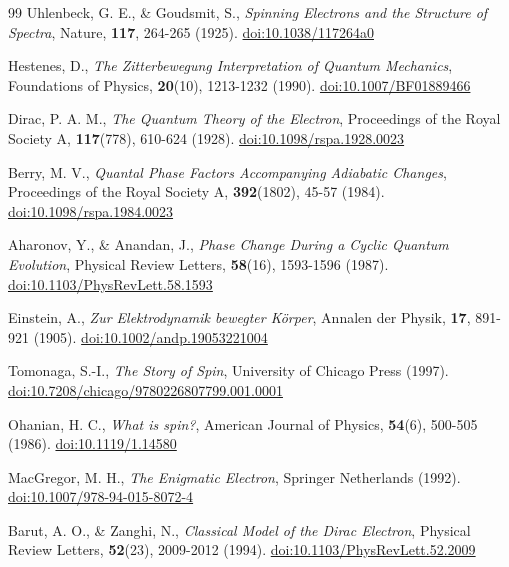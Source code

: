 \documentclass[%
 reprint,
 amsmath,amssymb,
 aps,
]{revtex4-1}
\numberwithin{equation}{section}%
\begin{document}
\begin{thebibliography}{99}
Uhlenbeck, G. E., \& Goudsmit, S.,
\textit{Spinning Electrons and the Structure of Spectra},
Nature,
\textbf{117}, 264-265 (1925).
\href{https://doi.org/10.1038/117264a0}{doi:10.1038/117264a0}

Hestenes, D.,
\textit{The Zitterbewegung Interpretation of Quantum Mechanics},
Foundations of Physics,
\textbf{20}(10), 1213-1232 (1990).
\href{https://doi.org/10.1007/BF01889466}{doi:10.1007/BF01889466}

Dirac, P. A. M.,
\textit{The Quantum Theory of the Electron},
Proceedings of the Royal Society A,
\textbf{117}(778), 610-624 (1928).
\href{https://doi.org/10.1098/rspa.1928.0023}{doi:10.1098/rspa.1928.0023}

Berry, M. V.,
\textit{Quantal Phase Factors Accompanying Adiabatic Changes},
Proceedings of the Royal Society A,
\textbf{392}(1802), 45-57 (1984).
\href{https://doi.org/10.1098/rspa.1984.0023}{doi:10.1098/rspa.1984.0023}

Aharonov, Y., \& Anandan, J.,
\textit{Phase Change During a Cyclic Quantum Evolution},
Physical Review Letters,
\textbf{58}(16), 1593-1596 (1987).
\href{https://doi.org/10.1103/PhysRevLett.58.1593}{doi:10.1103/PhysRevLett.58.1593}

Einstein, A.,
\textit{Zur Elektrodynamik bewegter Körper},
Annalen der Physik,
\textbf{17}, 891-921 (1905).
\href{https://doi.org/10.1002/andp.19053221004}{doi:10.1002/andp.19053221004}

Tomonaga, S.-I.,
\textit{The Story of Spin},
University of Chicago Press (1997).
\href{https://doi.org/10.7208/chicago/9780226807799.001.0001}{doi:10.7208/chicago/9780226807799.001.0001}

Ohanian, H. C.,
\textit{What is spin?},
American Journal of Physics,
\textbf{54}(6), 500-505 (1986).
\href{https://doi.org/10.1119/1.14580}{doi:10.1119/1.14580}

MacGregor, M. H.,
\textit{The Enigmatic Electron},
Springer Netherlands (1992).
\href{https://doi.org/10.1007/978-94-015-8072-4}{doi:10.1007/978-94-015-8072-4}

Barut, A. O., \& Zanghi, N.,
\textit{Classical Model of the Dirac Electron},
Physical Review Letters,
\textbf{52}(23), 2009-2012 (1994).
\href{https://doi.org/10.1103/PhysRevLett.52.2009}{doi:10.1103/PhysRevLett.52.2009}


\end{thebibliography}
\end{document}
